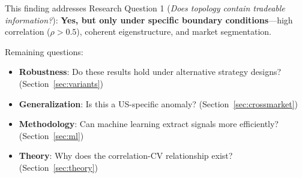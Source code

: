 This finding addresses Research Question 1 (\textit{Does topology contain tradeable information?}): \textbf{Yes, but only under specific boundary conditions}—high correlation ($\rho > 0.5$), coherent eigenstructure, and market segmentation.

Remaining questions:
\begin{itemize}
    \item \textbf{Robustness}: Do these results hold under alternative strategy designs? (Section~\ref{sec:variants})
    \item \textbf{Generalization}: Is this a US-specific anomaly? (Section~\ref{sec:crossmarket})
    \item \textbf{Methodology}: Can machine learning extract signals more efficiently? (Section~\ref{sec:ml})
    \item \textbf{Theory}: Why does the correlation-CV relationship exist? (Section~\ref{sec:theory})
\end{itemize}
